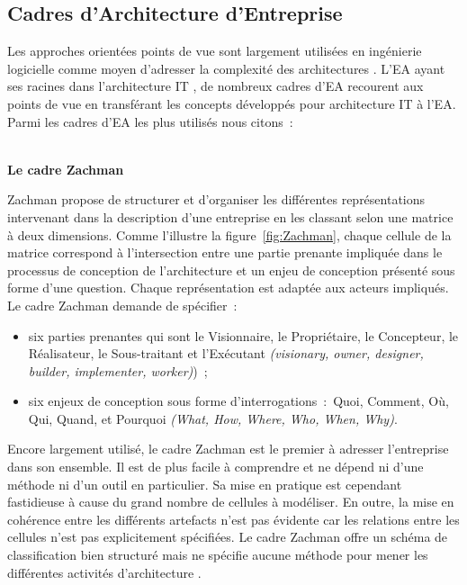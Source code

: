 	\subsection{Cadres d'Architecture d'Entreprise}

Les approches orientées points de vue sont largement utilisées en ingénierie logicielle comme moyen d'adresser la complexité des architectures \cite{steen2004supporting}. L'EA ayant ses racines dans l'architecture IT \cite{winter2008enterprise}, de nombreux cadres d'EA recourent aux points de vue en transférant les concepts développés pour architecture IT à l'EA. Parmi les cadres d'EA les plus utilisés nous citons~:
\\\

\textbf{Le cadre Zachman}

Zachman \cite{zachman1987framework} propose de structurer et d'organiser les différentes représentations intervenant dans la description d'une entreprise en les classant selon une matrice à deux dimensions. Comme l'illustre la figure~\ref{fig:Zachman}, chaque cellule de la matrice correspond à l'intersection entre une partie prenante impliquée dans le processus de conception de l'architecture et un enjeu de conception présenté sous forme d'une question. Chaque représentation est adaptée aux acteurs impliqués. Le cadre Zachman demande de spécifier~:

	\begin{itemize}

\item six parties prenantes qui sont le Visionnaire, le Propriétaire, le Concepteur, le Réalisateur, le Sous-traitant et l'Exécutant \textit{(visionary, owner, designer, builder, implementer, worker)})~;

\item six enjeux de conception sous forme d'interrogations~:~Quoi, Comment, Où, Qui, Quand, et Pourquoi \textit{(What, How, Where, Who, When, Why)}.
	\end{itemize}

Encore largement utilisé, le cadre Zachman est le premier à adresser l'entreprise dans son ensemble. Il est de plus facile à comprendre et ne dépend ni d'une méthode ni d'un outil en particulier. Sa mise en pratique est cependant fastidieuse à cause du grand nombre de cellules à modéliser. En outre, la mise en cohérence entre les différents artefacts n'est pas évidente car les relations entre les cellules n'est pas explicitement spécifiées. Le cadre Zachman offre un schéma de classification bien structuré mais ne spécifie aucune méthode pour mener les différentes activités d'architecture \cite{lankhorst2013enterprise}.


